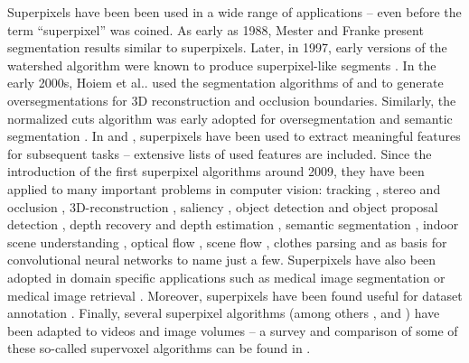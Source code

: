 \documentclass[5p]{elsarticle}
\makeatletter
\DeclareRobustCommand\onedot{\futurelet\@let@token\@onedot}
\def\@onedot{\ifx\@let@token.\else.\null\fi\xspace}
\def\etal{{et al}\onedot}
\makeatother
\begin{document}
Superpixels have been been used in a wide range of applications -- even before the term
``superpixel'' was coined. As early as 1988, Mester and Franke \cite{MesterFranke:1988}
present segmentation results similar to superpixels. Later, in 1997, early
versions of the watershed algorithm were known to produce superpixel-like segments
\cite{MarcoteguiMeyer:1997}. In the early 2000s, Hoiem \etal \cite{HoiemEfrosHebert:2005,HoiemSteinEfrosHebert:2007}
used the segmentation algorithms of \cite{FelzenswalbHuttenlocher:2004} and \cite{Meyer:1992}
to generate oversegmentations for 3D reconstruction and occlusion boundaries.
Similarly, the normalized cuts algorithm was early adopted for oversegmentation \cite{RenMalik:2003}
and semantic segmentation \cite{GouldRodgersCohenElidanKoller:2008}.
In \cite{HoiemEfrosHebert:2005,HoiemSteinEfrosHebert:2007} and \cite{TigheLazebnik:2010},
superpixels have been used to extract meaningful features for subsequent tasks
-- extensive lists of used features are included. Since the introduction of the
first superpixel algorithms around 2009, they have been applied to many important problems in computer vision:
tracking \cite{ShuWangHuchuanLuFanYangMingHsuanYang:2011,FanYangHuchuanLuMingHsuanYang:2014},
stereo and occlusion \cite{YuhangZhangHartleyMashfordBurn:2011,YamaguchiMcAllesterUrtasun:2014},
3D-reconstruction \cite{BodisSzomoruRiemenschneiderVanGool:2015}, saliency \cite{PerazziKrahenbuhlPritchhornung:2012,HeLauLiuHuangYang:2015},
object detection \cite{ShuDehghanShah:2013,YanYuZhuLeiLi:2015} 
and object proposal detection \cite{ArbelaezPontTusetBarronMarquesMalik:2014,RantalankilaKannalaRahtu:2014},
depth recovery \cite{VanDenBerghCartonVanGool:2013}
and depth estimation \cite{LiuSalzmannHe:2014,LiuShenLin:2014}, semantic segmentation \cite{GouldRodgersCohenElidanKoller:2008,LermaKosecka:2014}, indoor scene understanding \cite{LinFidlerUrtasun:2013,GuptaArbelaezGirshickMalik:2015,GeigerWang:2015},
optical flow \cite{LuYangMinDo:2013}, scene flow \cite{MenzeGeiger:2015}, 
clothes parsing \cite{YamaguchiKiapourOrtizBerg:2012,DongChenXiahuangYan:2013} and as basis for convolutional neural networks 
\cite{GaddeJampaniKiefelGehler:2015,HeLauLiuHuangYang:2015} to name just a few.
Superpixels have also been adopted in domain specific applications such as
medical image segmentation \cite{AndresKotheHelmstaedterDenkHamprecht:2008,LucchiSmithAchantaLepetitFua:2010,LucchiSmithAchantaKnottFua:2012}
or medical image retrieval \cite{HaasDonnerBurnerHolzerLangs:2011}.
Moreover, superpixels have been found useful for dataset annotation \cite{YamaguchiKiapourOrtizBerg:2012,LiuFengDomokosXuHuangHuYan:2014}.
Finally, several superpixel algorithms (among others \cite{VanDenBerghRoigBoixManenVanGool:2013},
\cite{AchantaShajiSmithLucchiFuaSuesstrunk:2012} and \cite{GrundmannKwatraHanEssa:2010}) have
been adapted to videos and image volumes -- a survey and comparison of some of these
so-called supervoxel algorithms can be found in \cite{XuCorso:2012}.
\end{document}
